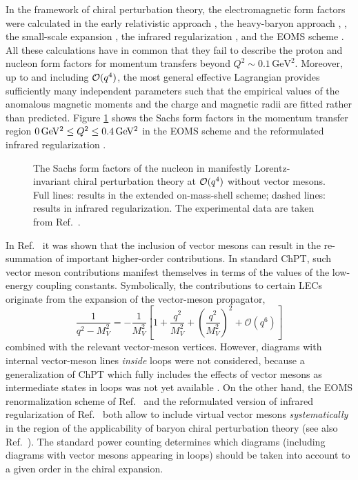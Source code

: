 \documentclass[twoside,12pt]{article}
\begin{document}
    In the framework of chiral perturbation theory, the electromagnetic form
factors were calculated in the early relativistic approach \cite{Gasser:1987rb},
the heavy-baryon approach \cite{Bernard:1992qa}, \cite{Fearing:1997dp},
the small-scale expansion \cite{Bernard:1998gv}, the infrared regularization
\linebreak\cite{Kubis:2000zd}, and the EOMS scheme \cite{Fuchs:2003ir}.
   All these calculations have in common that they fail to describe the proton and nucleon
form factors for momentum transfers beyond $Q^2\sim 0.1\, \mbox{GeV}^2$.
   Moreover, up to and including ${\cal O}(q^4)$, the most general effective Lagrangian
provides sufficiently many independent parameters such that the empirical values of the
anomalous magnetic moments and the charge and magnetic radii are fitted rather than predicted.
   Figure \ref{G_ohne} shows the Sachs form factors in the momentum transfer region
$0\,{\rm GeV^2}\le Q^2\le 0.4\,{\rm GeV^2}$ in the EOMS scheme and the reformulated
infrared regularization \cite{Schindler:2005ke}.
\begin{figure}[t]
\begin{center}
\end{center}
\caption{\label{G_ohne} The Sachs form factors of the nucleon in manifestly
Lorentz-invariant chiral perturbation theory at ${\cal O}(q^4)$ without vector
mesons. Full lines: results in the extended on-mass-shell scheme; dashed lines:
results in infrared regularization. The experimental data are taken from
Ref.\ \cite{Friedrich:2003iz}.}
\end{figure}

   In Ref.\ \cite{Kubis:2000zd} it was shown that the
inclusion of vector mesons can result in the re-summation of
important higher-order contributions.
   In standard ChPT, such vector meson contributions manifest themselves
in terms of the values of the low-energy coupling constants.
   Symbolically, the contributions to certain LECs originate from
the expansion of the vector-meson propagator,
\begin{displaymath}
\frac{1}{q^2-M_{V}^2}=-\frac{1}{M_{V}^2}
\left[1+\frac{q^2}{M_{V}^2}+\left(\frac{q^2}{M_{V}^2}\right)^2+\mathcal{O}(q^6)\right]
\end{displaymath}
combined with the relevant vector-meson vertices.
   However, diagrams with internal vector-meson lines {\em inside} loops
were not considered, because a generalization
of ChPT which fully includes the effects of vector mesons as intermediate
states in loops was not yet available \cite{Kubis:2000zd}.
   On the other hand, the EOMS renormalization scheme of Ref.~\cite{Fuchs:2003qc} and
the reformulated version of infrared regularization of
Ref.~\cite{Schindler:2003xv} both allow to include virtual vector mesons {\em
systematically} in the region of the applicability of baryon chiral perturbation
theory \cite{Fuchs:2003sh} (see also Ref.\ \cite{Bruns:2008ub}).
   The standard power counting determines which diagrams
(including diagrams with vector mesons appearing in loops) should be taken into
account to a given order in the chiral expansion.
\end{document}
